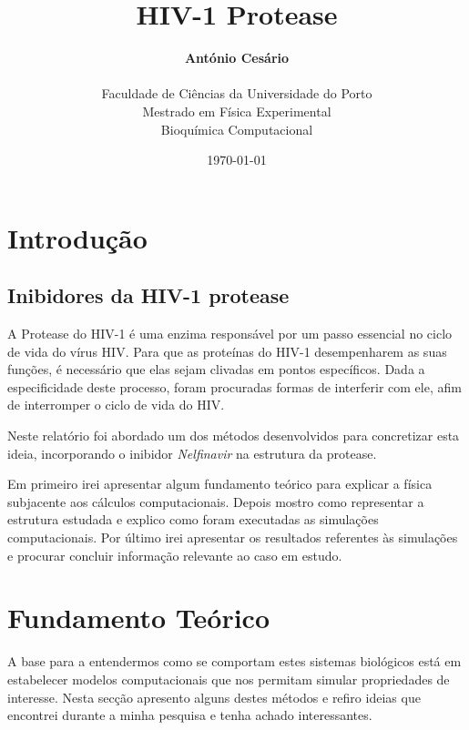 \documentclass[12pt,a4paper]{article}
\title{\textbf{HIV-1 Protease}}
\author{\textbf{António Cesário}\\\\%
	Faculdade de Ciências da Universidade do Porto\\%
	Mestrado em Física Experimental\\%
	Bioquímica Computacional%
	}
\date{\today}
\begin{document}
	\maketitle
	\begin{abstract}
		\lipsum[1]
	\end{abstract}
	\newpage
	
\section{Introdução}
\subsection{Inibidores da HIV-1 protease}
	A Protease do HIV-1 é uma enzima responsável por um passo essencial no ciclo de vida do vírus HIV. Para que as proteínas do HIV-1 desempenharem as suas funções, é necessário que elas sejam clivadas em pontos específicos. Dada a especificidade deste processo, foram procuradas formas de interferir com ele, afim de interromper o ciclo de vida do HIV.
	
	Neste relatório foi abordado um dos métodos desenvolvidos para concretizar esta ideia, incorporando o inibidor \textit{Nelfinavir} na estrutura da protease.
	
	Em primeiro irei apresentar algum fundamento teórico para explicar a física subjacente aos cálculos computacionais. Depois mostro como representar a estrutura estudada e explico como foram executadas as simulações computacionais. Por último irei apresentar os resultados referentes às simulações e procurar concluir informação relevante ao caso em estudo.
	
\section{Fundamento Teórico}
	A base para a entendermos como se comportam estes sistemas biológicos está em estabelecer modelos computacionais que nos permitam simular propriedades de interesse. Nesta secção apresento alguns destes métodos e refiro ideias que encontrei durante a minha pesquisa e tenha achado interessantes.
	
\end{document}
